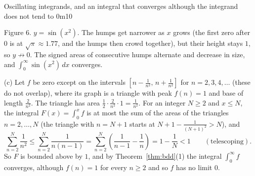 \documentclass[11pt]{article}
\begin{document}
\begin{exmp}{Oscillating integrands, and an integral that converges although the integrand does not tend to $0$}{m10}
\begin{center}
\end{center}
\begin{center}\small Figure 6. $y=\sin\left(x^2\right)$. The humps get narrower as $x$ grows (the first zero after $0$ is at $\sqrt\pi\approx1.77$, and the humps then crowd together), but their height stays $1$, so $y\not\to0$. The signed areas of consecutive humps alternate and decrease in size, and $\int_0^\infty\sin(x^2)\,dx$ converges.\end{center}

(c) Let $f$ be zero except on the intervals $\left[n-\frac1{n^2},\,n+\frac1{n^2}\right]$ for $n=2,3,4,\dots$ (these do not overlap), where its graph is a triangle with peak $f(n)=1$ and base of length $\frac2{n^2}$. The triangle has area $\frac12\cdot\frac2{n^2}\cdot1=\frac1{n^2}$. For an integer $N\ge2$ and $x\le N$, the integral $F(x)=\int_0^xf$ is at most the sum of the areas of the triangles $n=2,\dots,N$ (the triangle with $n=N+1$ starts at $N+1-\frac1{(N+1)^2}>N$), and
\[\sum_{n=2}^N\frac1{n^2}\le\sum_{n=2}^N\frac1{n(n-1)}=\sum_{n=2}^N\left(\frac1{n-1}-\frac1n\right)=1-\frac1N<1\qquad(\text{telescoping}).\]
So $F$ is bounded above by $1$, and by Theorem~\ref{thm:bdd}(1) the integral $\int_0^\infty f$ converges, although $f(n)=1$ for every $n\ge2$ and so $f$ has no limit $0$.
\end{exmp}
\end{document}
